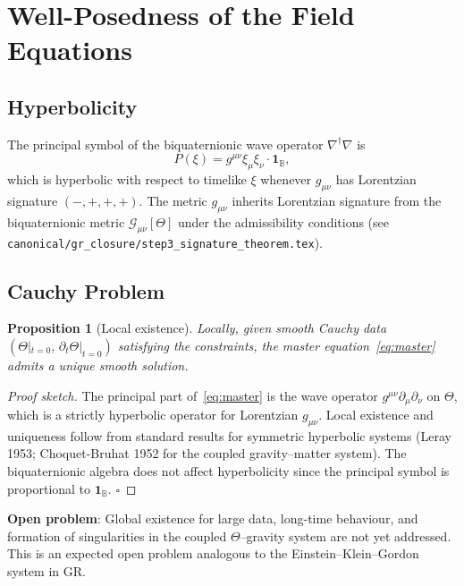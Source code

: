 \documentclass[11pt,a4paper]{article}
\newtheorem{proposition}[theorem]{Proposition}
\theoremstyle{definition}
\theoremstyle{remark}
\begin{document}
\section{Well-Posedness of the Field Equations}\label{sec:wellposed}

\subsection{Hyperbolicity}

The principal symbol of the biquaternionic wave operator
$\nabla^\dagger\nabla$ is
\begin{equation}
  P(\xi) = g^{\mu\nu}\xi_\mu\xi_\nu \cdot \mathbf{1}_{\mathbb{B}},
\end{equation}
which is hyperbolic with respect to timelike $\xi$ whenever $g_{\mu\nu}$ has
Lorentzian signature $(-,+,+,+)$.  The metric $g_{\mu\nu}$ inherits
Lorentzian signature from the biquaternionic metric
$\mathcal{G}_{\mu\nu}[\Theta]$ under the admissibility conditions
(see \texttt{canonical/gr\_closure/step3\_signature\_theorem.tex}).

\subsection{Cauchy Problem}

\begin{proposition}[Local existence]\label{prop:cauchy}
  Locally, given smooth Cauchy data
  $(\Theta|_{t=0},\,\partial_t\Theta|_{t=0})$ satisfying the constraints,
  the master equation~\eqref{eq:master} admits a unique smooth solution.
\end{proposition}

\begin{proof}[Proof sketch]
The principal part of~\eqref{eq:master} is the wave operator $g^{\mu\nu}\partial_\mu\partial_\nu$
on $\Theta$, which is a strictly hyperbolic operator for Lorentzian $g_{\mu\nu}$.
Local existence and uniqueness follow from standard results for symmetric
hyperbolic systems (Leray 1953; Choquet-Bruhat 1952 for the coupled
gravity--matter system).  The biquaternionic algebra does not affect
hyperbolicity since the principal symbol is proportional to
$\mathbf{1}_\mathbb{B}$. $\square$
\end{proof}

\begin{tcolorbox}[colback=yellow!8!white,colframe=orange!60!black,title=Gap: global well-posedness]
\textbf{Open problem}: Global existence for large data, long-time behaviour,
and formation of singularities in the coupled $\Theta$--gravity system
are not yet addressed.  This is an expected open problem analogous to
the Einstein--Klein--Gordon system in GR.
\end{tcolorbox}
\end{document}

